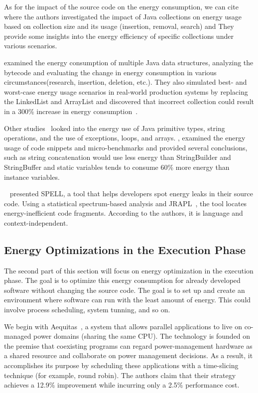 As for the impact of the source code on the energy consumption, we can cite~\cite{pinto_comprehensive_2016,fernandes_assisting_2017} where the authors investigated the impact of Java collections on energy usage based on collection size and its usage (insertion, removal, search) and They provide some insights into the energy efficiency of specific collections under various scenarios.

\citeauthor{hasan_energy_2016} examined the energy consumption of multiple Java data structures, analyzing the bytecode and evaluating the change in energy consumption in various circumstances(research, insertion, deletion, etc.). They also simulated best- and worst-case energy usage scenarios in real-world production systems by replacing the LinkedList and ArrayList and discovered that incorrect collection could result in a 300\% increase in energy consumption~\cite{hasan_energy_2016}.

Other studies~\cite{longo_reducing_2019,kumar_energy_2017} looked into the energy use of Java primitive types, string operations, and the use of exceptions, loops, and arrays. \citeauthor{kumar_energy_2017}, examined the energy usage of code snippets and micro-benchmarks and provided several conclusions, such as string concatenation would use less energy than StringBuilder and StringBuffer and static variables tends to consume 60\% more energy than instance variables.

\citeauthor{pereira_helping_2017}~\cite{pereira_helping_2017} presented SPELL, a tool that helps developers spot energy leaks in their source code. Using a statistical spectrum-based analysis and JRAPL~\cite{guimaraes2016some,liu_data-oriented_2015}, the tool locates energy-inefficient code fragments. According to the authors, it is language and context-independent.

\subsection{Energy Optimizations in the Execution Phase}
The second part of this section will focus on energy optimization in the execution phase. The goal is to optimize this energy consumption for already developed software without changing the source code. The goal is to set up and create an environment where software can run with the least amount of energy. This could involve process scheduling, system tunning, and so on.

We begin with Aequitas~\cite{ribic2016aequitas}, a system that allows parallel applications to live on co-managed power domains (sharing the same CPU). The technology is founded on the premise that coexisting programs can regard power-management hardware as a shared resource and collaborate on power management decisions. As a result, it accomplishes its purpose by scheduling these applications with a time-slicing technique (for example, round robin). The authors claim that their strategy achieves a 12.9\% improvement while incurring only a 2.5\% performance cost.

